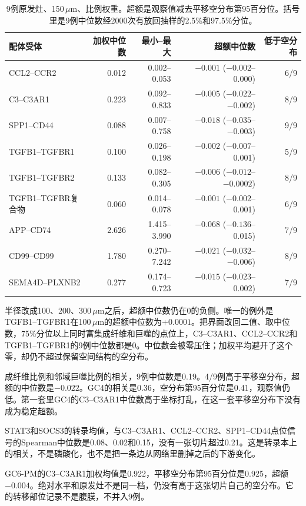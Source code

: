 \begin{table}[htbp]
  \centering
  \caption{9例原发灶、150\,$\mu$m、比例权重。超额是观察值减去平移空分布第95百分位。括号里是9例中位数经2000次有放回抽样的2.5\%和97.5\%分位。}
  \label{tab:interface}
  \footnotesize
  \setlength{\tabcolsep}{3pt}
  \begin{tabular}{lrrrr}
    \toprule
    配体受体 & 加权中位数 & 最小--最大 & 超额中位数 & 低于空分布 \\
    \midrule
    CCL2--CCR2 & 0.012 & 0.002--0.053 & $-0.001$ ($-0.002$--0.000) & 6/9 \\
    C3--C3AR1 & 0.223 & 0.092--0.833 & $-0.005$ ($-0.022$--$-0.002$) & 8/9 \\
    SPP1--CD44 & 0.088 & 0.007--0.758 & $-0.018$ ($-0.035$--$-0.003$) & 9/9 \\
    TGFB1--TGFBR1 & 0.100 & 0.026--0.198 & $-0.002$ ($-0.007$--0.001) & 5/9 \\
    TGFB1--TGFBR2 & 0.133 & 0.082--0.305 & $-0.006$ ($-0.012$--$-0.0002$) & 8/9 \\
    TGFB1--TGFBR复合物 & 0.060 & 0.014--0.078 & $-0.001$ ($-0.002$--0.001) & 6/9 \\
    APP--CD74 & 2.626 & 1.415--3.990 & $-0.068$ ($-0.136$--0.015) & 7/9 \\
    CD99--CD99 & 1.780 & 0.270--7.242 & $-0.021$ ($-0.032$--$-0.006$) & 8/9 \\
    SEMA4D--PLXNB2 & 0.277 & 0.174--0.723 & $-0.015$ ($-0.023$--0.002) & 7/9 \\
    \bottomrule
  \end{tabular}
\end{table}

半径改成100、200、300\,$\mu$m之后，超额中位数仍在0的负侧。唯一的例外是TGFB1--TGFBR1在100\,$\mu$m的超额中位数为$+0.0001$。把界面改回二值、取中位数，75\%分位以上同时富集成纤维和巨噬的点位上，C3--C3AR1、CCL2--CCR2和TGFB1--TGFBR1的9例中位数都是0。中位数会被零压住；加权平均避开了这个零，却仍不超过保留空间结构的空分布。

成纤维比例和邻域巨噬比例的相关，9例中位数是0.19。4/9例高于平移空分布，超额的中位数是$-0.022$。GC4的相关是0.36，空分布第95百分位是0.41，观察值仍低。第一套里GC4的C3--C3AR1中位数高于坐标打乱，在这一套平移空分布下没有成为稳定超额。

STAT3和SOCS3的转录均值，与C3--C3AR1、CCL2--CCR2、SPP1--CD44点位信号的Spearman中位数是0.08、0.02和0.15，没有一张切片超过0.21。这是转录本上的相关，不是磷酸化，也不是把一条边从网络里删掉之后的下游变化。

GC6-PM的C3--C3AR1加权均值是0.922，平移空分布第95百分位是0.925，超额$-0.004$。绝对水平和原发灶不是同一档，仍没有高于这张切片自己的空分布。它的转移部位记录不是腹膜，不并入9例。

